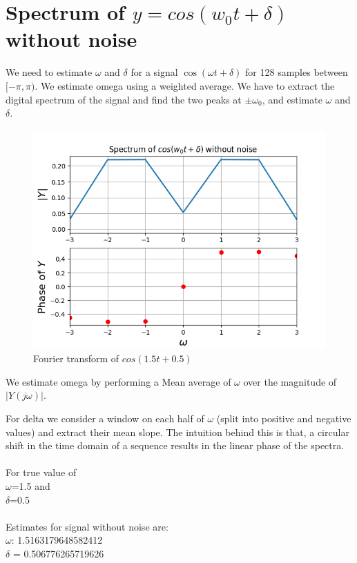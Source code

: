 \documentclass{article}
\begin{document}
\section{Spectrum of $y = cos(w_0t + \delta)$ without noise}
We need to estimate $\omega$ and $\delta$ for a signal $\cos(\omega t + \delta)$ for 128 samples between $[-\pi,\pi)$. We estimate omega using a weighted average. We have to extract the digital spectrum of the signal and find the two peaks at $\pm\omega_0$, and estimate $\omega$ and $\delta$.
\begin{figure}[h!]
\centering
\includegraphics[scale=0.6]{Figure_10.png}
\caption{Fourier transform of $cos(1.5t+0.5)$}
\label{fig:universe}
\end{figure}

We estimate omega by performing a Mean average of $\omega$ over the magnitude of $|Y(j\omega)|$.

For delta we consider a window on each half of $\omega$ (split into positive and negative values) and extract their mean slope. The intuition behind this is that, a circular shift in the time domain of a sequence results in the linear phase of the spectra.\\\\
For true value of\\
$\omega$=1.5 and\\ 
$\delta$=0.5\\\\
Estimates for signal without noise are:\\
$\omega$: 1.5163179648582412\\
$\delta$ = 0.506776265719626
\end{document}
